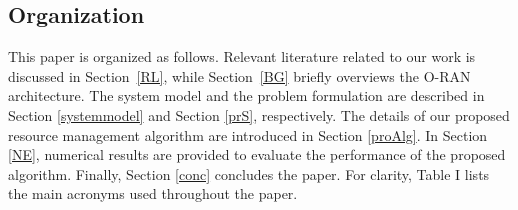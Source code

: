 \documentclass[lettersize,journal]{IEEEtran}
\begin{document}
\subsection{Organization}
\vspace{-1mm}
This paper is organized as follows.
Relevant literature related to our work is discussed in Section~\ref{RL}, while Section~\ref{BG} briefly overviews the O-RAN architecture.
The system model and the problem formulation are described in Section \ref{systemmodel} and Section \ref{prS}, respectively. The details of our proposed resource management algorithm are introduced in Section \ref{proAlg}. In Section \ref{NE}, numerical results are provided to evaluate the performance of the proposed algorithm. Finally, Section \ref{conc} concludes the paper. For clarity, Table I lists the main acronyms used throughout the paper.
\end{document}
